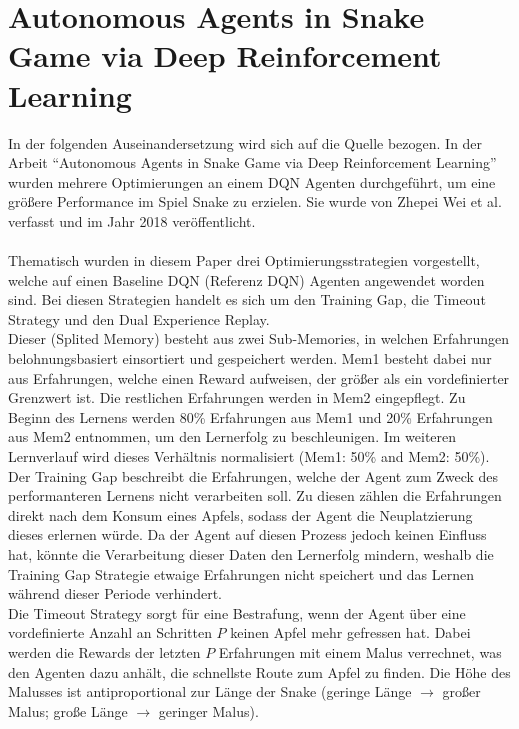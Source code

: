 \section{Autonomous Agents in Snake Game via Deep Reinforcement Learning} \label{sec:Verwandte_Arbeiten_Paper_1}
In der folgenden Auseinandersetzung wird sich auf die Quelle \cite{Autonomous_Agents_in_Snake_Game_via_DRL} bezogen.
In der Arbeit "`Autonomous Agents in Snake Game via Deep Reinforcement Learning"' wurden mehrere Optimierungen an einem DQN Agenten durchgeführt, um eine größere Performance im Spiel Snake zu erzielen. Sie wurde von Zhepei Wei et al. verfasst und im Jahr 2018 veröffentlicht.\\
\\Thematisch wurden in diesem Paper drei Optimierungsstrategien vorgestellt, welche auf einen Baseline DQN (Referenz DQN) Agenten angewendet worden sind. Bei diesen Strategien handelt es sich um den Training Gap, die Timeout Strategy und den Dual Experience Replay.\\
Dieser (Splited Memory) besteht aus zwei Sub-Memories, in welchen Erfahrungen belohnungsbasiert einsortiert und gespeichert werden. Mem1 besteht dabei nur aus Erfahrungen, welche einen Reward aufweisen, der größer als ein vordefinierter Grenzwert ist. Die restlichen Erfahrungen werden in Mem2 eingepflegt. 
Zu Beginn des Lernens werden 80\% Erfahrungen aus Mem1 und 20\% Erfahrungen aus Mem2 entnommen, um den Lernerfolg zu beschleunigen. Im weiteren Lernverlauf wird dieses Verhältnis normalisiert (Mem1: 50\% and Mem2: 50\%).\\
Der Training Gap beschreibt die Erfahrungen, welche der Agent zum Zweck des performanteren Lernens nicht verarbeiten soll. Zu diesen zählen die Erfahrungen direkt nach dem Konsum eines Apfels, sodass der Agent die Neuplatzierung dieses erlernen würde. 
Da der Agent auf diesen Prozess jedoch keinen Einfluss hat, könnte die Verarbeitung dieser Daten den Lernerfolg mindern, weshalb die Training Gap Strategie etwaige Erfahrungen nicht speichert und das Lernen während dieser Periode verhindert.\\
Die Timeout Strategy sorgt für eine Bestrafung, wenn der Agent über eine vordefinierte Anzahl an Schritten $P$ keinen Apfel mehr gefressen hat. Dabei werden die Rewards der letzten $P$ Erfahrungen mit einem Malus verrechnet, was den Agenten dazu anhält, die schnellste Route zum Apfel zu finden. Die Höhe des Malusses ist antiproportional zur Länge der Snake (geringe Länge $\rightarrow$ großer Malus; große Länge $\rightarrow$ geringer Malus).\\
